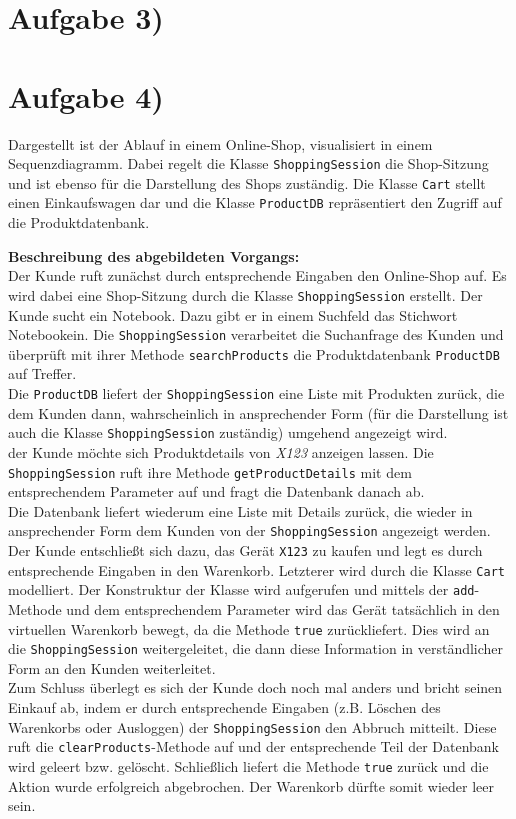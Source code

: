 \documentclass{swp1}
\begin{document}
\section*{Aufgabe 3)}
\section*{Aufgabe 4)}

Dargestellt ist der Ablauf in einem Online-Shop, visualisiert in einem Sequenzdiagramm. Dabei regelt die Klasse \texttt{ShoppingSession} die Shop-Sitzung und ist ebenso für die Darstellung des Shops zuständig. Die Klasse \texttt{Cart} stellt einen Einkaufswagen dar und die Klasse \texttt{ProductDB} repräsentiert den Zugriff auf die Produktdatenbank.

\textbf{Beschreibung des abgebildeten Vorgangs:}\\
Der Kunde ruft zunächst durch entsprechende Eingaben den Online-Shop auf. Es wird dabei eine Shop-Sitzung durch die Klasse \texttt{ShoppingSession} erstellt. Der Kunde sucht ein Notebook. Dazu gibt er in einem Suchfeld das Stichwort \glqq Notebook\grqq ein. Die \texttt{ShoppingSession} verarbeitet die Suchanfrage des Kunden und überprüft mit ihrer Methode \texttt{searchProducts} die Produktdatenbank \texttt{ProductDB} auf Treffer.\\
Die \texttt{ProductDB} liefert der \texttt{ShoppingSession} eine Liste mit Produkten zurück, die dem Kunden dann, wahrscheinlich in ansprechender Form (für die Darstellung ist auch die Klasse \texttt{ShoppingSession} zuständig) umgehend angezeigt wird.\\
der Kunde möchte sich Produktdetails von \textit{X123} anzeigen lassen. Die \texttt{ShoppingSession} ruft ihre Methode \texttt{getProductDetails} mit dem entsprechendem Parameter auf und fragt die Datenbank danach ab. \\
Die Datenbank liefert wiederum eine Liste mit Details zurück, die wieder in ansprechender Form dem Kunden von der \texttt{ShoppingSession} angezeigt werden.\\
Der Kunde entschließt sich dazu, das Gerät \texttt{X123} zu kaufen und legt es durch entsprechende Eingaben in den Warenkorb. Letzterer wird durch die Klasse \texttt{Cart} modelliert. Der Konstruktur der Klasse wird aufgerufen und mittels der \texttt{add}-Methode und dem entsprechendem Parameter wird das Gerät tatsächlich in den virtuellen Warenkorb bewegt, da die Methode \texttt{true} zurückliefert. Dies wird an die \texttt{ShoppingSession} weitergeleitet, die dann diese Information in verständlicher Form an den Kunden weiterleitet. \\
Zum Schluss überlegt es sich der Kunde doch noch mal anders und bricht seinen Einkauf ab, indem er durch entsprechende Eingaben (z.B. Löschen des Warenkorbs oder Ausloggen) der \texttt{ShoppingSession} den Abbruch mitteilt. Diese ruft die \texttt{clearProducts}-Methode auf und der entsprechende Teil der Datenbank wird geleert bzw. gelöscht. Schließlich liefert die Methode \texttt{true} zurück und die Aktion wurde erfolgreich abgebrochen. Der Warenkorb dürfte somit wieder leer sein.
\clearpage
\end{document}

